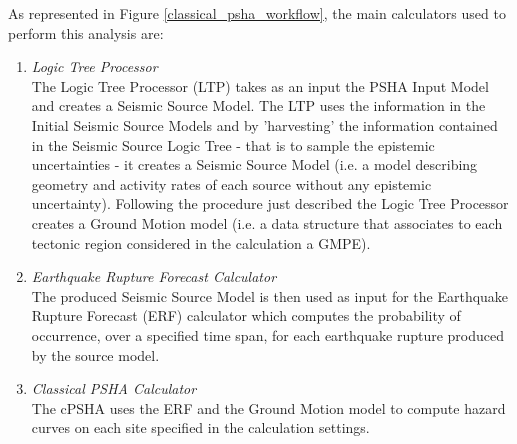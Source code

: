 
As represented in Figure \ref{classical_psha_workflow}, the main calculators 
used to perform this analysis are:
\begin{enumerate}
%
\item \emph{Logic Tree Processor} \hfill \\
The Logic Tree Processor (LTP) takes as an input the PSHA Input Model and 
creates a Seismic Source Model. The LTP uses the information in the Initial 
Seismic Source Models and by 'harvesting' the information contained in the 
Seismic Source Logic Tree - that is to sample the epistemic uncertainties - 
it creates a Seismic Source Model (i.e. a model describing geometry and 
activity rates of each source without any epistemic uncertainty). 
%
Following the procedure just described the Logic Tree Processor creates a 
Ground Motion model (i.e. a data structure that associates to each tectonic 
region considered in the calculation a GMPE).
%
\item \emph{Earthquake Rupture Forecast Calculator} \hfill \\
The produced Seismic Source Model is then used as input for the Earthquake 
Rupture Forecast (ERF) calculator which computes the probability of occurrence, 
over a specified time span, for each earthquake rupture produced by the source 
model.
\item \emph{Classical PSHA Calculator} \hfill \\
The cPSHA uses the ERF and the Ground Motion model to compute hazard curves on 
each site specified in the calculation settings.
\end{enumerate} 
%
